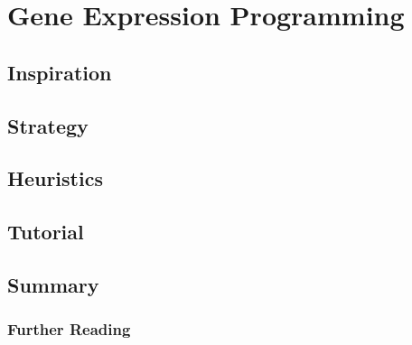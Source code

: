 \section{Gene Expression Programming}

\subsection{Inspiration}


\subsection{Strategy}


\subsection{Heuristics}


\subsection{Tutorial}


\subsection{Summary}


\subsubsection{Further Reading}